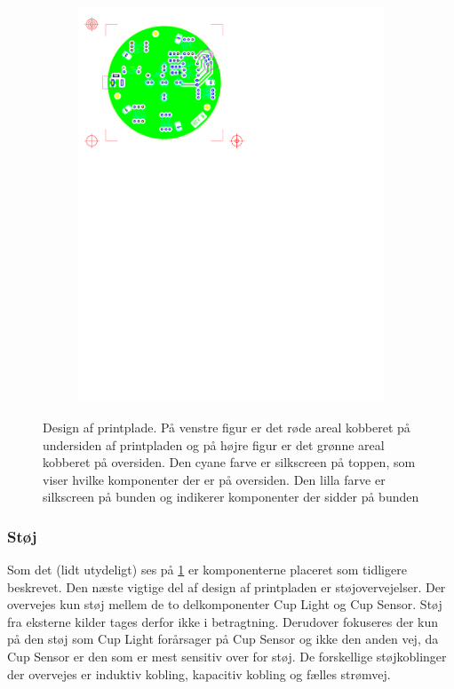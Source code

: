 \documentclass[HardwareDesign/HardwareDesign_main.tex]{subfiles}
\begin{document}
\begin{figure}[H]
{\begin{subfigure}{.55\textwidth}
    \includegraphics[width=1\linewidth,trim={0.6in 7.28in 4.5in 0.5in},clip, page=1]{HardwareDesign/CupHolder/graphics/top.pdf}
\end{subfigure}
}
\caption{Design af printplade. På venstre figur er det røde areal kobberet på undersiden af printpladen og på højre figur er det grønne areal kobberet på oversiden. Den cyane farve er silkscreen på toppen, som viser hvilke komponenter der er på oversiden. Den lilla farve er silkscreen på bunden og indikerer komponenter der sidder på bunden}
\label{fig:CupHolderPrintpladeDesign}
\end{figure}


\subsubsection{Støj}
Som det (lidt utydeligt) ses på \ref{fig:CupHolderPrintpladeDesign} er komponenterne placeret som tidligere beskrevet. Den næste vigtige del af design af printpladen er støjovervejelser. Der overvejes kun støj mellem de to delkomponenter Cup Light og Cup Sensor. Støj fra eksterne kilder tages derfor ikke i betragtning. Derudover fokuseres der kun på den støj som Cup Light forårsager på Cup Sensor og ikke den anden vej, da Cup Sensor er den som er mest sensitiv over for støj. De forskellige støjkoblinger der overvejes er induktiv kobling, kapacitiv kobling og fælles strømvej.
\end{document}
